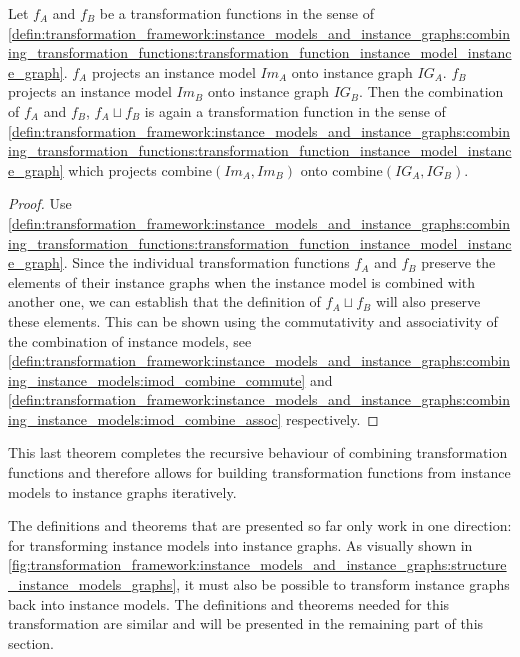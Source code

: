 \begin{thm}
\label{defin:transformation_framework:instance_models_and_instance_graphs:combining_transformation_functions:ig_combine_mapping_function_correct}
Let $f_A$ and $f_B$ be a transformation functions in the sense of \cref{defin:transformation_framework:instance_models_and_instance_graphs:combining_transformation_functions:transformation_function_instance_model_instance_graph}. $f_A$ projects an instance model $Im_A$ onto instance graph $IG_A$. $f_B$ projects an instance model $Im_B$ onto instance graph $IG_B$. Then the combination of $f_A$ and $f_B$, $f_{A} \sqcup f_{B}$ is again a transformation function in the sense of \cref{defin:transformation_framework:instance_models_and_instance_graphs:combining_transformation_functions:transformation_function_instance_model_instance_graph} which projects $\mathrm{combine}(Im_A, Im_B)$ onto $\mathrm{combine}(IG_A, IG_B)$.
\end{thm}

\begin{proof}
Use \cref{defin:transformation_framework:instance_models_and_instance_graphs:combining_transformation_functions:transformation_function_instance_model_instance_graph}. Since the individual transformation functions $f_A$ and $f_B$ preserve the elements of their instance graphs when the instance model is combined with another one, we can establish that the definition of $f_{A} \sqcup f_{B}$ will also preserve these elements. This can be shown using the commutativity and associativity of the combination of instance models, see \cref{defin:transformation_framework:instance_models_and_instance_graphs:combining_instance_models:imod_combine_commute} and \cref{defin:transformation_framework:instance_models_and_instance_graphs:combining_instance_models:imod_combine_assoc} respectively.
\end{proof}

This last theorem completes the recursive behaviour of combining transformation functions and therefore allows for building transformation functions from instance models to instance graphs iteratively.

The definitions and theorems that are presented so far only work in one direction: for transforming instance models into instance graphs. As visually shown in \cref{fig:transformation_framework:instance_models_and_instance_graphs:structure_instance_models_graphs}, it must also be possible to transform instance graphs back into instance models. The definitions and theorems needed for this transformation are similar and will be presented in the remaining part of this section.

